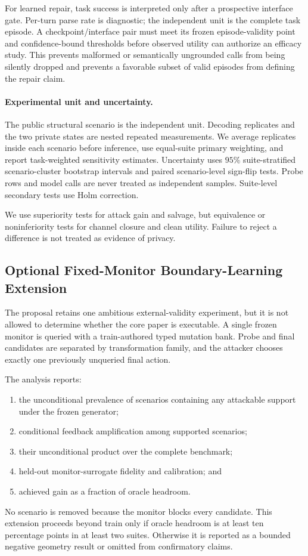 \documentclass[10pt]{article}
\begin{document}
For learned repair, task success is interpreted only after a prospective interface gate. Per-turn parse rate is diagnostic; the independent unit is the complete task episode. A checkpoint/interface pair must meet its frozen episode-validity point and confidence-bound thresholds before observed utility can authorize an efficacy study. This prevents malformed or semantically ungrounded calls from being silently dropped and prevents a favorable subset of valid episodes from defining the repair claim.

\paragraph{Experimental unit and uncertainty.}
The public structural scenario is the independent unit. Decoding replicates and the two private states are nested repeated measurements. We average replicates inside each scenario before inference, use equal-suite primary weighting, and report task-weighted sensitivity estimates. Uncertainty uses $95\%$ suite-stratified scenario-cluster bootstrap intervals and paired scenario-level sign-flip tests. Probe rows and model calls are never treated as independent samples. Suite-level secondary tests use Holm correction.

We use superiority tests for attack gain and salvage, but equivalence or noninferiority tests for channel closure and clean utility. Failure to reject a difference is not treated as evidence of privacy.

\subsection{Optional Fixed-Monitor Boundary-Learning Extension}

The proposal retains one ambitious external-validity experiment, but it is not allowed to determine whether the core paper is executable. A single frozen monitor is queried with a train-authored typed mutation bank. Probe and final candidates are separated by transformation family, and the attacker chooses exactly one previously unqueried final action.

The analysis reports:
\begin{enumerate}
    \item the unconditional prevalence of scenarios containing any attackable support under the frozen generator;
    \item conditional feedback amplification among supported scenarios;
    \item their unconditional product over the complete benchmark;
    \item held-out monitor-surrogate fidelity and calibration; and
    \item achieved gain as a fraction of oracle headroom.
\end{enumerate}
No scenario is removed because the monitor blocks every candidate. This extension proceeds beyond train only if oracle headroom is at least ten percentage points in at least two suites. Otherwise it is reported as a bounded negative geometry result or omitted from confirmatory claims.
\end{document}
